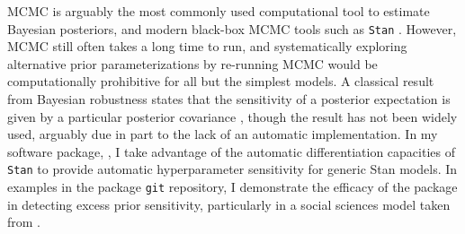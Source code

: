 MCMC is arguably the most commonly used computational tool to estimate Bayesian
posteriors, and modern black-box MCMC tools such as \texttt{Stan} \citep{rstan,
carpenter:2017:stan}.  However, MCMC still often takes a long time to run, and
systematically exploring alternative prior parameterizations by re-running MCMC
would be computationally prohibitive for all but the simplest models. A
classical result from Bayesian robustness states that the sensitivity of a
posterior expectation is given by a particular posterior covariance
\citep{gustafson:1996:localposterior, basu:1996:local}, though the result has
not been widely used, arguably due in part to the lack of an automatic
implementation. In my software package, \citet{giordano:2020:rstansensitivity},
I take advantage of the automatic differentiation capacities of
\texttt{Stan} to provide automatic hyperparameter sensitivity for
generic Stan models.  In examples in the package \texttt{git} repository,
I demonstrate the efficacy of the package in detecting excess prior
sensitivity, particularly in a social sciences model taken from
\citet[Chapter 13.5]{gelman:2006:arm}.
%
%
%
%
%
%
%
%
%
%
